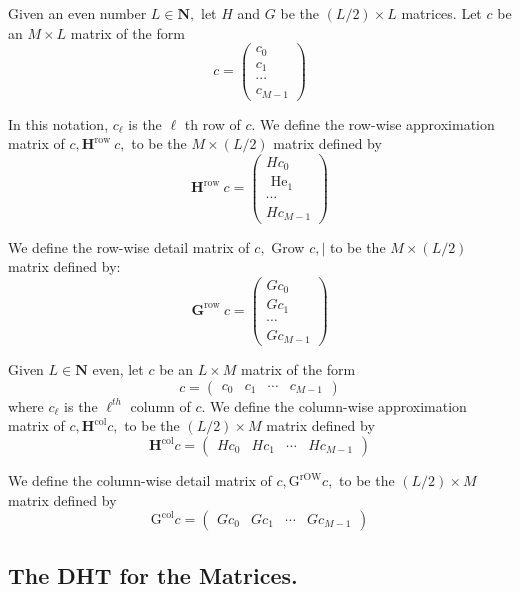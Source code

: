Given an even number $L \in \mathbf{N},$ let $H$ and $G$ be the $(L / 2) \times L$ matrices. Let $c$ be an $M \times L$ matrix of the form
$$
c=\left(\begin{array}{c}{c_{0}} \\ {c_{1}} \\ {\cdots} \\ {c_{M-1}}\end{array}\right)
$$

In this notation, $c_{\ell}$ is the $\ell$ th row of $c .$ We define the row-wise approximation matrix of $c, \mathbf{H}^{\text {row }} c,$ to be the $M \times(L / 2)$ matrix defined by
$$
\mathbf{H}^{\text {row }} c=\left(\begin{array}{c}{H c_{0}} \\ {\text { He}_{1}} \\ {\cdots} \\ {H c_{M-1}}\end{array}\right)
$$

We define the row-wise detail matrix of $c,$ Grow $c, |$ to be the $M \times(L / 2)$
matrix defined by:
$$
\mathbf{G}^{\text {row }} c=\left(\begin{array}{c}{G c_{0}} \\ {G c_{1}} \\ {\cdots} \\ {G c_{M-1}}\end{array}\right)
$$


Given $L \in \mathbf{N}$ even, let $c$ be an $L \times M$ matrix of the form
$$
c=\left(\begin{array}{cccc}{c_{0}} & {c_{1}} & {\cdots} & {c_{M-1}}\end{array}\right)
$$
where $c_{\ell}$ is the $\ell^{t h}$ column of $c$. We define the column-wise approximation matrix of $c, \mathbf{H}^{\operatorname{col}} c,$ to be the $(L / 2) \times M$ matrix defined by
$$
\mathbf{H}^{\operatorname{col}} c=\left(\begin{array}{cccc}{H c_{0}} & {H c_{1}} & {\cdots} & {H c_{M-1}}\end{array}\right)
$$

We define the column-wise detail matrix of $c, \mathrm{G}^{\mathrm{rOW}} c,$ to be the $(L / 2) \times M$ matrix defined by
$$
\mathrm{G}^{\mathrm{col}} c=\left(\begin{array}{cccc}{G c_{0}} & {G c_{1}} & {\cdots} & {G c_{M-1}}\end{array}\right)
$$

\subsection{The DHT for the Matrices.}

